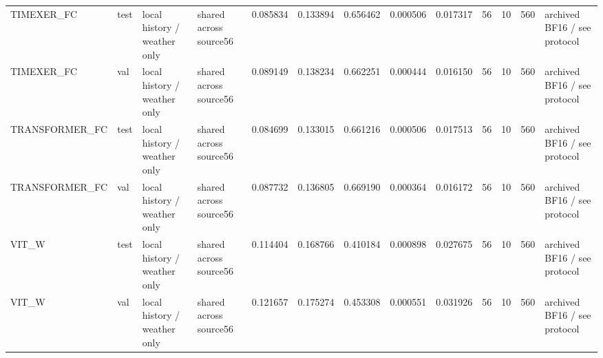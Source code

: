 \begin{tabular}{llllrrrrrrrrl}
TIMEXER\_FC & test & local history / weather only & shared across source56 & 0.085834 & 0.133894 & 0.656462 & 0.000506 & 0.017317 & 56 & 10 & 560 & archived BF16 / see protocol \\
TIMEXER\_FC & val & local history / weather only & shared across source56 & 0.089149 & 0.138234 & 0.662251 & 0.000444 & 0.016150 & 56 & 10 & 560 & archived BF16 / see protocol \\
TRANSFORMER\_FC & test & local history / weather only & shared across source56 & 0.084699 & 0.133015 & 0.661216 & 0.000506 & 0.017513 & 56 & 10 & 560 & archived BF16 / see protocol \\
TRANSFORMER\_FC & val & local history / weather only & shared across source56 & 0.087732 & 0.136805 & 0.669190 & 0.000364 & 0.016172 & 56 & 10 & 560 & archived BF16 / see protocol \\
VIT\_W & test & local history / weather only & shared across source56 & 0.114404 & 0.168766 & 0.410184 & 0.000898 & 0.027675 & 56 & 10 & 560 & archived BF16 / see protocol \\
VIT\_W & val & local history / weather only & shared across source56 & 0.121657 & 0.175274 & 0.453308 & 0.000551 & 0.031926 & 56 & 10 & 560 & archived BF16 / see protocol \\
\bottomrule
\end{tabular}
